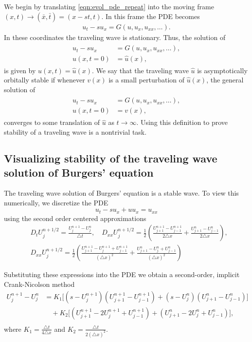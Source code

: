 We begin by translating \eqref{eqn:evol_pde_repeat} into the moving frame $(x,t) \to (\bar{x},\bar{t}) = (x-st, t)$.
In this frame the PDE becomes
\begin{align*}
u_t - su_x = G(u,u_x, u_{xx}, \ldots).
\end{align*}
In these coordinates the traveling wave is stationary.
Thus, the solution of
\begin{align*}
\begin{split}
u_t - su_x &= G(u,u_x, u_{xx}, \ldots), \\
u(x,t = 0) &= \hat{u}(x),
\end{split}
\end{align*}
is given by $u(x,t) = \hat{u}(x)$.
We say that the traveling wave $\hat{u}$ is asymptotically orbitally stable if whenever $v(x)$ is a small perturbation of $\hat{u}(x)$, the general solution of
\begin{align*}
\begin{split}
u_t - su_x &= G(u,u_x, u_{xx}, \ldots), \\
u(x,t = 0) &= v(x),
\end{split}
\end{align*}
converges to some translation of $\hat{u}$ as $t \to \infty$.
Using this definition to prove stability of a traveling wave is a nontrivial task.

\subsection*{Visualizing stability of the traveling wave solution of Burgers' equation}
The traveling wave solution of Burgers' equation is a stable wave.
To view this numerically, we discretize the PDE
\[u_t -su_x + uu_x = u_{xx}\]
using the second order centered approximations
\begin{align*}
&{ } D_t U_j^{n+1/2} = \frac{U_j^{n+1}-U_j^n}{\triangle t}, \quad
D_{xx}U_j^{n+1/2} = \frac{1}{2} \left( \frac{U_{j+1}^{n+1}-U_{j-1}^{n+1}}{2 \triangle x} +  \frac{U_{j+1}^{n}-U_{j-1}^{n}}{2 \triangle x}\right),\\
&{ } D_{xx}U_j^{n+1/2} = \frac{1}{2} \left( \frac{U_{j+1}^{n+1}- U_{j}^{n+1}+U_{j-1}^{n+1}}{(\triangle x)^2} + \frac{U_{j+1}^{n}- U_{j}^{n}+U_{j-1}^{n}}{(\triangle x)^2}\right)
\end{align*}

Substituting these expressions into the PDE we obtain a second-order, implicit Crank-Nicolson method
\begin{align*}
U_j^{n+1} - U_j^n &= K_1 \big[(s - U_j^{n+1})(U_{j+1}^{n+1} - U_{j-1}^{n+1})
+ (s - U_j^n) (U_{j+1}^n - U_{j-1}^n) \big] \\
&{ }  \quad
+ K_2 \big[(U_{j+1}^{n+1} - 2U_j^{n+1}+ U_{j-1}^{n+1}) + (U_{j+1}^n -2U_j^n + U_{j-1}^n) \big],\\
&{ }  \quad
\end{align*}
where $K_1 = \frac{ \triangle t }{4 \triangle x}$ and $K_2 = \frac{ \triangle t}{2(\triangle x)^2}$.

